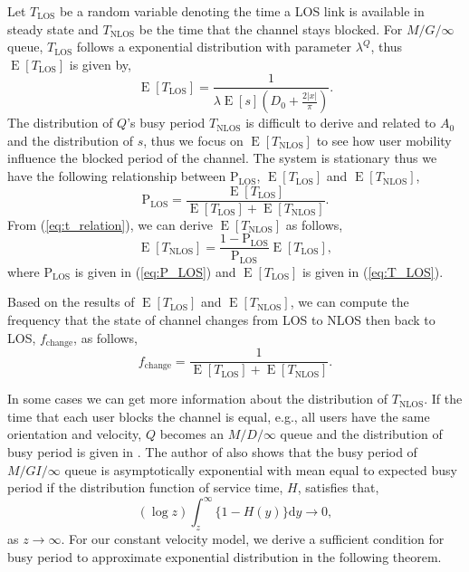 \documentclass[10pt, conference, letterpaper]{IEEEtran}
\DeclareMathOperator*{\E}{\mathrm{E}}
\DeclareMathOperator*{\LOS}{\mathrm{LOS}}
\DeclareMathOperator*{\NLOS}{\mathrm{NLOS}}
\begin{document}
Let $T_{\mathrm{LOS}}$ be a random variable denoting the time a LOS link is available in steady state and $T_{\mathrm{NLOS}}$ be the time that the channel stays blocked. For $M/G/\infty$ queue, $T_{\mathrm{LOS}}$ follows a exponential distribution with parameter $\lambda^Q$, thus $\E[T_{\mathrm{LOS}}]$ is given by, 
\begin{equation}\label{eq:T_LOS}
\E[T_{\mathrm{LOS}}] = \frac{1}{\lambda\E[s](D_0 + \frac{2|x|}{\pi})}.
\end{equation}
The distribution of $Q$'s busy period $T_{\NLOS}$ is difficult to derive and related to $A_0$ and the distribution of $s$, thus we focus on $\E[T_{\mathrm{NLOS}}]$ to see how user mobility influence the blocked period of the channel. The system is stationary thus we have the following relationship between $\mathrm{P}_{\LOS}$, $\E[T_{\LOS}]$ and $\E[T_{\NLOS}]$, 
\begin{equation}\label{eq:t_relation}
\mathrm{P}_{\LOS} = \frac{\E[T_{\LOS}]}{\E[T_{\LOS}] + \E[T_{\NLOS}]}.
\end{equation}
From (\ref{eq:t_relation}), we can derive $\E[T_{\NLOS}]$ as follows, 
\begin{equation*}\label{eq:T_NLOS}
\E[T_{\NLOS}] = \frac{1-\mathrm{P}_{\LOS}}{\mathrm{P}_{\LOS}}\E[T_{\LOS}],
\end{equation*}
where $\mathrm{P}_{\LOS}$ is given in (\ref{eq:P_LOS}) and $\E[T_{\LOS}]$ is given in (\ref{eq:T_LOS}).

Based on the results of $\E[T_{\LOS}]$ and $\E[T_{\NLOS}]$, we can compute the frequency that the state of channel changes from LOS to NLOS then back to LOS, $f_{\mathrm{change}}$, as follows,
\begin{equation*}\label{eq:frequency}
f_{\mathrm{change}} = \frac{1}{\E[T_{\LOS}] + \E[T_{\NLOS}]}.
\end{equation*}  

In some cases we can get more information about the distribution of $T_{\NLOS}$. If the time that each user blocks the channel is equal, e.g., all users have the same orientation and velocity, $Q$ becomes an $M/D/\infty$ queue and the distribution of busy period is given in \cite{busyperiod_heavytraffic}. The author of \cite{busyperiod_heavytraffic} also shows that the busy period of $M/GI/\infty$ queue is asymptotically exponential with mean equal to expected busy period if the distribution function of service time, $H$, satisfies that,  
\begin{equation}\label{eq:busyperiod_condition}
(\log z) \int_{z}^{\infty}\{1-H(y)\}\mathrm{d}y\rightarrow 0,
\end{equation}
as $z\rightarrow \infty$. 
For our constant velocity model, we derive a sufficient condition for busy period to approximate exponential distribution in the following theorem.
\end{document}
